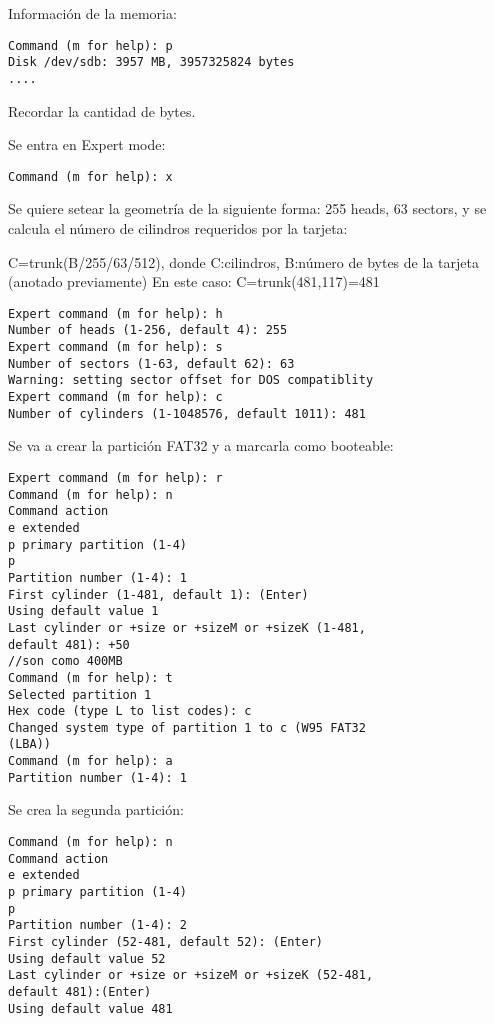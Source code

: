 Información de la memoria: 

\begin{verbatim}
Command (m for help): p 
Disk /dev/sdb: 3957 MB, 3957325824 bytes 
.... 
\end{verbatim}

Recordar la cantidad de bytes.

\newpage
Se entra en Expert mode: 

\bigskip
\begin{verbatim}
Command (m for help): x 
\end{verbatim}

Se quiere setear la geometría de la siguiente forma: 255 heads, 63 sectors, y se calcula el 
número de cilindros requeridos por la tarjeta: 

\bigskip
C=trunk(B/255/63/512), donde C:cilindros, B:número de bytes de la tarjeta (anotado previamente) 
En este caso: C=trunk(481,117)=481 

\begin{verbatim}
Expert command (m for help): h 
Number of heads (1-256, default 4): 255 
Expert command (m for help): s 
Number of sectors (1-63, default 62): 63 
Warning: setting sector offset for DOS compatiblity 
Expert command (m for help): c 
Number of cylinders (1-1048576, default 1011): 481 
\end{verbatim}


Se va a crear la partición FAT32 y a marcarla como booteable: 

\begin{verbatim}
Expert command (m for help): r 
Command (m for help): n 
Command action 
e extended 
p primary partition (1-4) 
p 
Partition number (1-4): 1 
First cylinder (1-481, default 1): (Enter) 
Using default value 1 
Last cylinder or +size or +sizeM or +sizeK (1-481, 
default 481): +50 
//son como 400MB 
Command (m for help): t 
Selected partition 1 
Hex code (type L to list codes): c 
Changed system type of partition 1 to c (W95 FAT32 
(LBA)) 
Command (m for help): a 
Partition number (1-4): 1 
\end{verbatim}

\newpage
Se crea la segunda partición: 

\begin{verbatim}
Command (m for help): n 
Command action 
e extended 
p primary partition (1-4) 
p 
Partition number (1-4): 2 
First cylinder (52-481, default 52): (Enter) 
Using default value 52 
Last cylinder or +size or +sizeM or +sizeK (52-481, 
default 481):(Enter) 
Using default value 481 
\end{verbatim}

